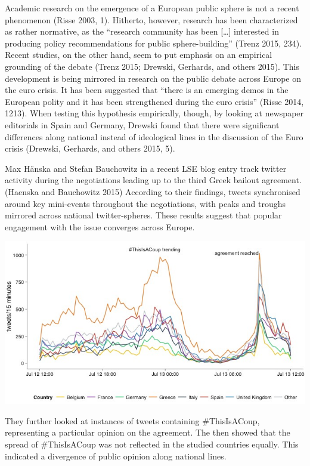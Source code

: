 \documentclass[]{article}
\makeatletter
\def\maxwidth{\ifdim\Gin@nat@width>\linewidth\linewidth
\else\Gin@nat@width\fi}
\let\Oldincludegraphics\includegraphics
\renewcommand{\includegraphics}[1]{\Oldincludegraphics[width=\maxwidth]{#1}}
\makeatother
\begin{document}
Academic research on the emergence of a European public sphere is not a
recent phenomenon (Risse 2003, 1). Hitherto, however, research has been
characterized as rather normative, as the ``research community has been
{[}\ldots{}{]} interested in producing policy recommendations for public
sphere-building'' (Trenz 2015, 234). Recent studies, on the other hand,
seem to put emphasis on an empirical grounding of the debate (Trenz
2015; Drewski, Gerhards, and others 2015). This development is being
mirrored in research on the public debate across Europe on the euro
crisis. It has been suggested that ``there is an emerging demos in the
European polity and it has been strengthened during the euro crisis''
(Risse 2014, 1213). When testing this hypothesis empirically, though, by
looking at newspaper editorials in Spain and Germany, Drewski found that
there were significant differences along national instead of ideological
lines in the discussion of the Euro crisis (Drewski, Gerhards, and
others 2015, 5).

Max Hänska and Stefan Bauchowitz in a recent LSE blog entry track
twitter activity during the negotiations leading up to the third Greek
bailout agreement. (Haenska and Bauchowitz 2015) According to their
findings, tweets synchronised around key mini-events throughout the
negotiations, with peaks and troughs mirrored across national
twitter-spheres. These results suggest that popular engagement with the
issue converges across Europe.

\includegraphics{img/Greece-twitter-1.jpg}

They further looked at instances of tweets containing \#ThisIsACoup,
representing a particular opinion on the agreement. The then showed that
the spread of \#ThisIsACoup was not reflected in the studied countries
equally. This indicated a divergence of public opinion along national
lines.
\end{document}
